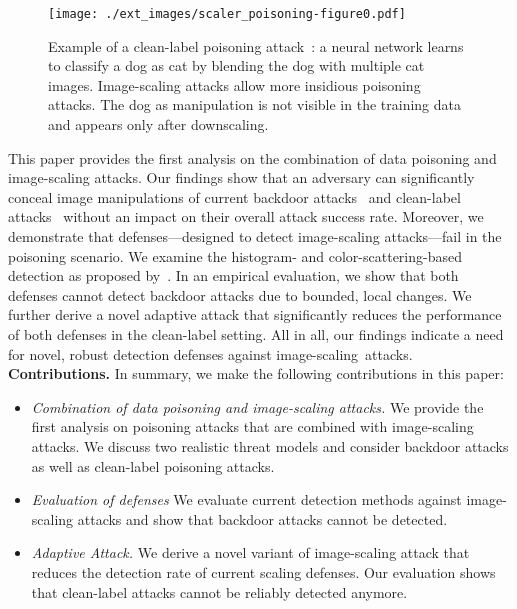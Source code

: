 \documentclass[conference]{IEEEtran}
\renewcommand{\paragraph}[1]{{\vskip 8pt \noindent\bf #1 }}
\begin{document}
\begin{figure}[t]
	\centering
	\texttt{[image: ./ext\_images/scaler\_poisoning-figure0.pdf]}
	\vspace{-0.59cm}
	\caption{Example of a clean-label poisoning 
	attack~\citep{ShaHuaNaj+18}: a neural network 
	learns to classify a dog as cat by blending the dog with multiple 
	cat images. Image-scaling attacks allow more insidious poisoning attacks.
	The dog as manipulation is not visible in the training data and 
	appears only after downscaling.
	}
	\label{fig:intro_example_poisoning}
\end{figure}

This paper provides the first analysis on the combination of data 
poisoning and image-scaling attacks. Our findings show that an 
adversary can significantly conceal image manipulations of current 
backdoor attacks~\citep{GuDolGar17} and clean-label 
attacks~\citep{ShaHuaNaj+18} without an impact on their overall attack 
success rate.
Moreover, we demonstrate that defenses---designed to detect 
image-scaling attacks---fail in the poisoning scenario.
We examine the histogram- and color-scattering-based detection as 
proposed by~\citet{XiaCheShe+19}. In an empirical evaluation, we show 
that both defenses cannot detect backdoor attacks due to bounded, 
local changes. We further derive a novel adaptive attack that 
significantly reduces the performance of both defenses in the 
clean-label setting.
All in all, our findings indicate a need for novel, robust detection 
defenses against image-scaling~attacks.
\paragraph{Contributions.}  In summary, we make the following
contributions in this paper:
\begin{itemize}  \setlength{\itemsep}{3pt}
	
	\item \emph{Combination of data poisoning and image-scaling 
	attacks.}  
	We provide the first analysis on poisoning attacks that are 
	combined with image-scaling attacks. We discuss two realistic 
	threat models and consider backdoor attacks as well as clean-label 
	poisoning attacks.
		
	\item \emph{Evaluation of defenses} 
	We evaluate current detection methods against image-scaling 
	attacks and show that backdoor attacks cannot be detected.
	
	\item \emph{Adaptive Attack.} We derive a novel variant of
	image-scaling attack that reduces the detection rate 
	of current scaling defenses. Our evaluation 
	shows that clean-label attacks cannot be reliably detected anymore.
\end{itemize}
\end{document}
